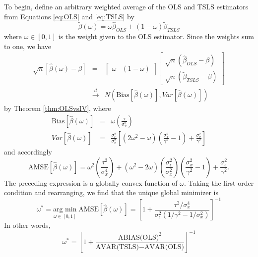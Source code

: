 To begin, define an arbitrary weighted average of the OLS and TSLS estimators from Equations \ref{eq:OLS} and \ref{eq:TSLS} by  
\begin{equation}
	\widetilde{\beta}(\omega) = \omega \widehat{\beta}_{OLS} + (1 - \omega) \widetilde{\beta}_{TSLS}
\end{equation}
where $\omega \in [0,1]$ is the weight given to the OLS estimator.
Since the weights sum to one, we have
\begin{eqnarray*}
	\sqrt{n}\left[\widehat{\beta}(\omega) - \beta \right] &=& \left[ \begin{array}
	{cc} \omega & (1 - \omega)
\end{array}\right] \left[
\begin{array}{c}
  \sqrt{n}(\widehat{\beta}_{OLS} - \beta) \\
  \sqrt{n}(\widetilde{\beta}_{TSLS} - \beta)
\end{array}
\right]\\
& \overset{d}{\rightarrow} & N\left(\mbox{Bias}\left[\widehat{\beta}(\omega)\right], Var\left[\widehat{\beta}(\omega)\right] \right)
\end{eqnarray*}
by Theorem \ref{thm:OLSvsIV}, where
\begin{eqnarray*}
	\mbox{Bias}\left[\widehat{\beta}(\omega)\right] &=& \omega \left( \frac{\tau}{\sigma_x^2} \right) \\
	 Var\left[\widehat{\beta}(\omega)\right] &=&  \frac{\sigma_\epsilon^2}{\sigma_x^2} \left[(2\omega^2 - \omega)\left( \frac{\sigma_x^2}{\gamma^2} - 1\right)+\frac{\sigma_x^2}{\gamma^2} \right]
\end{eqnarray*}
and accordingly
\begin{equation}
	\mbox{AMSE}\left[\widehat{\beta}(\omega) \right] =  \omega^2 \left(\frac{\tau^2}{\sigma_x^4} \right) + (\omega^2 - 2 \omega)\left(\frac{\sigma_\epsilon^2}{\sigma_x^2}\right)\left( \frac{\sigma_x^2}{\gamma^2} - 1\right) + \frac{\sigma_\epsilon^2}{\gamma^2}.
\end{equation}
The preceding expression is a globally convex function of $\omega$. 
Taking the first order condition and rearranging, we find that the unique global minimizer is
\begin{equation}
\label{eq:AMSEoptimal}
	\omega^* = \underset{\omega \in [0,1]}{\mbox{arg min}}\; \mbox{AMSE}\left[\widehat{\beta}(\omega) \right] 
	=\left[1 + \frac{\tau^2/\sigma_x^4}{\sigma_\epsilon^2(1/\gamma^2 - 1/\sigma_x^2)}\right]^{-1}
\end{equation}
In other words,
$$\omega^* = \left[1 + \frac{\mbox{ABIAS(OLS)}^2}{\mbox{AVAR(TSLS)}-\mbox{AVAR(OLS)}} \right]^{-1}$$

